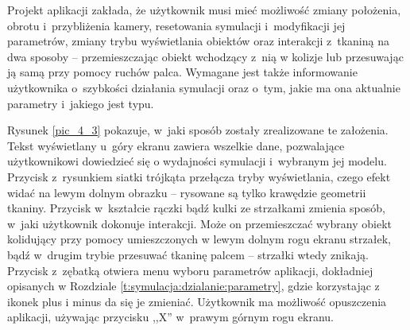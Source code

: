 		
		
		Projekt aplikacji zakłada, że użytkownik musi mieć możliwość zmiany położenia, obrotu i~przybliżenia kamery, resetowania symulacji i~modyfikacji jej parametrów, zmiany trybu wyświetlania obiektów oraz interakcji z~tkaniną na dwa sposoby -- przemieszczając obiekt wchodzący z~nią w kolizje lub przesuwając ją samą przy pomocy ruchów palca. Wymagane jest także informowanie użytkownika o~szybkości działania symulacji oraz o~tym, jakie ma ona aktualnie parametry i~jakiego jest typu.
		
		Rysunek \ref{pic_4_3} pokazuje, w~jaki sposób zostały zrealizowane te założenia. Tekst wyświetlany u~góry ekranu zawiera wszelkie dane, pozwalające użytkownikowi dowiedzieć się o wydajności symulacji i~wybranym jej modelu. Przycisk z~rysunkiem siatki trójkąta przełącza tryby wyświetlania, czego efekt widać na lewym dolnym obrazku -- rysowane są tylko krawędzie geometrii tkaniny. Przycisk w~kształcie rączki bądź kulki ze strzałkami zmienia sposób, w~jaki użytkownik dokonuje interakcji. Może on przemieszczać wybrany obiekt kolidujący przy pomocy umieszczonych w lewym dolnym rogu ekranu strzałek, bądź w~drugim trybie przesuwać tkaninę palcem -- strzałki wtedy znikają. Przycisk z~zębatką otwiera menu wyboru parametrów aplikacji, dokładniej opisanych w Rozdziale \ref{t:symulacja:dzialanie:parametry}, gdzie korzystając z ikonek plus i minus da się je zmieniać. Użytkownik ma możliwość opuszczenia aplikacji, używając przycisku ,,X'' w~prawym górnym rogu ekranu.
